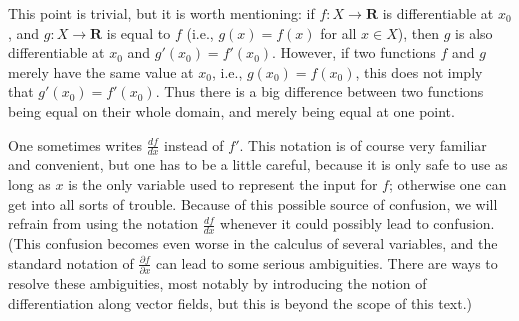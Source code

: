 \setcounter{theorem}{3}
\begin{remark}\label{10.1.4}
    This point is trivial, but it is worth mentioning:
    if \(f : X \to \mathbf{R}\) is differentiable at \(x_0\), and \(g : X \to \mathbf{R}\) is equal to \(f\) (i.e., \(g(x) = f(x)\) for all \(x \in X\)), then \(g\) is also differentiable at \(x_0\) and \(g'(x_0) = f'(x_0)\).
    However, if two functions \(f\) and \(g\) merely have the same value at \(x_0\), i.e., \(g(x_0) = f(x_0)\), this does not imply that \(g'(x_0) = f'(x_0)\).
    Thus there is a big difference between two functions being equal on their whole domain, and merely being equal at one point.
\end{remark}

\begin{remark}\label{10.1.5}
    One sometimes writes \(\frac{df}{dx}\) instead of \(f'\).
    This notation is of course very familiar and convenient, but one has to be a little careful, because it is only safe to use as long as \(x\) is the only variable used to represent the input for \(f\);
    otherwise one can get into all sorts of trouble.
    Because of this possible source of confusion, we will refrain from using the notation \(\frac{df}{dx}\) whenever it could possibly lead to confusion.
    (This confusion becomes even worse in the calculus of several variables, and the standard notation of \(\frac{\partial f}{\partial x}\) can lead to some serious ambiguities.
    There are ways to resolve these ambiguities, most notably by introducing the notion of differentiation along vector fields, but this is beyond the scope of this text.)
\end{remark}

